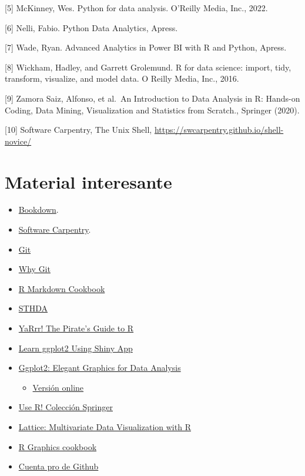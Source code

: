 \documentclass[
]{book}
\providecommand{\tightlist}{%
  \setlength{\itemsep}{0pt}\setlength{\parskip}{0pt}}
\begin{document}
{[}5{]} McKinney, Wes. Python for data analysis. O'Reilly Media, Inc., 2022.

{[}6{]} Nelli, Fabio. Python Data Analytics, Apress.

{[}7{]} Wade, Ryan. Advanced Analytics in Power BI with R and Python, Apress.

{[}8{]} Wickham, Hadley, and Garrett Grolemund. R for data science: import, tidy, transform, visualize, and
model data. O Reilly Media, Inc., 2016.

{[}9{]} Zamora Saiz, Alfonso, et al.~An Introduction to Data Analysis in R: Hands-on Coding, Data Mining,
Visualization and Statistics from Scratch., Springer (2020).

{[}10{]} Software Carpentry, The Unix Shell, \url{https://swcarpentry.github.io/shell-novice/}

\hypertarget{material-interesante}{%
\section{Material interesante}\label{material-interesante}}

\begin{itemize}
\tightlist
\item
  \href{https://bookdown.org/}{Bookdown}.
\item
  \href{https://swcarpentry.github.io/r-novice-gapminder/}{Software Carpentry}.
\item
  \href{https://swcarpentry.github.io/git-novice/14-supplemental-rstudio/}{Git}
\item
  \href{https://info5940.infosci.cornell.edu/setup/git/what-is-git/}{Why Git}
\item
  \href{https://bookdown.org/yihui/rmarkdown-cookbook/}{R Markdown Cookbook}
\item
  \href{http://www.sthda.com/english/wiki/data-visualization}{STHDA}
\item
  \href{https://bookdown.org/ndphillips/YaRrr/}{YaRrr! The Pirate's Guide to R}
\item
  \href{https://link.springer.com/book/10.1007/978-3-319-53019-2}{Learn ggplot2 Using Shiny App}
\item
  \href{https://link.springer.com/book/10.1007/978-0-387-98141-3}{Ggplot2: Elegant Graphics for Data Analysis}

  \begin{itemize}
  \tightlist
  \item
    \href{https://ggplot2-book.org/index.html}{Versión online}
  \end{itemize}
\item
  \href{https://www.springer.com/series/6991/books}{Use R! Colección Springer}
\item
  \href{https://link.springer.com/book/10.1007/978-0-387-75969-2}{Lattice: Multivariate Data Visualization with R}
\item
  \href{http://www.cookbook-r.com/}{R Graphics cookbook}
\item
  \href{https://education.github.com/benefits}{Cuenta pro de Github}
\end{itemize}
\end{document}
